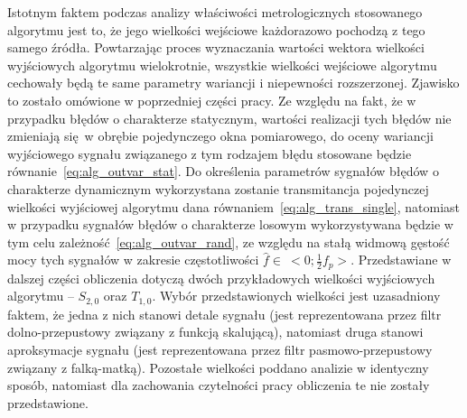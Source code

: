 Istotnym faktem podczas analizy właściwości metrologicznych stosowanego algorytmu jest to, że jego wielkości wejściowe każdorazowo pochodzą z tego samego źródła. Powtarzając proces wyznaczania wartości wektora wielkości wyjściowych algorytmu wielokrotnie, wszystkie wielkości wejściowe algorytmu cechowały będą te same parametry wariancji i niepewności rozszerzonej. Zjawisko to zostało omówione w poprzedniej części pracy. Ze względu na fakt, że w przypadku błędów o charakterze statycznym, wartości realizacji tych błędów nie zmieniają się w obrębie pojedynczego okna pomiarowego, do oceny wariancji wyjściowego sygnału związanego z tym rodzajem błędu stosowane będzie równanie~\eqref{eq:alg_outvar_stat}. Do określenia parametrów sygnałów błędów o charakterze dynamicznym wykorzystana zostanie transmitancja pojedynczej wielkości wyjściowej algorytmu dana równaniem~\eqref{eq:alg_trans_single}, natomiast w przypadku sygnałów błędów o charakterze losowym wykorzystywana będzie w tym celu zależność~\eqref{eq:alg_outvar_rand}, ze względu na stałą widmową gęstość mocy tych sygnałów w zakresie częstotliwości $\hat{f} \in~<0;\frac{1}{2} f_{p}>$.
Przedstawiane w dalszej części obliczenia dotyczą dwóch przykładowych wielkości wyjściowych algorytmu -- $S_{2,0}$ oraz $T_{1,0}$. Wybór przedstawionych wielkości jest uzasadniony faktem, że jedna z nich stanowi detale sygnału (jest reprezentowana przez filtr dolno-przepustowy związany z funkcją skalującą), natomiast druga stanowi aproksymacje sygnału (jest reprezentowana przez filtr pasmowo-przepustowy związany z falką-matką). Pozostałe wielkości poddano analizie w identyczny sposób, natomiast dla zachowania czytelności pracy obliczenia te nie zostały przedstawione.


